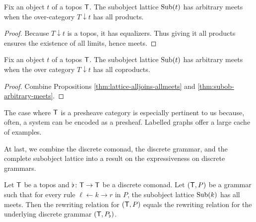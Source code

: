 \documentclass{amsart}
\begin{document}
\begin{proposition} \label{thm:subob-arbitrary-meets}
  Fix an object $t$ of a topos $ \mathsf{T} $.  The subobject
  lattice $ \operatorname{Sub} (t) $ has arbitrary meets when the over-category 
	$ T \downarrow t $ has all products.
\end{proposition}

\begin{proof}
  Because $ T \downarrow t $ is a topos, it has
  equalizers. Thus giving it all products ensures the
  existence of all limits, hence meets. 
\end{proof}

\begin{corollary}
  Fix an object $t$ of a topos $ \mathsf{T} $.  The subobject
  lattice $ \operatorname{Sub} (t) $ has arbitrary meets when the over
  category $ T \downarrow t $ has all coproducts.
\end{corollary}

\begin{proof}
  Combine Propositions \ref{thm:lattice-alljoins-allmeets}
  and \ref{thm:subob-arbitrary-meets}.
\end{proof}

The case where $\mathsf{T}$ is a presheave category is especially pertinent to us because, often, a system can be encoded as a presheaf. Labelled graphs offer a large cache of examples.

At last, we combine the discrete comonad, the discrete
grammar, and the complete subobject lattice into a result on
the expressiveness on discrete grammars.

\begin{theorem}
  \label{thm:production-same-rewrite-relation-as-discrete}  
  Let $ \mathsf{T} $ be a topos and $ \flat \colon \mathsf{T} \to \mathsf{T} $ be a
  discrete comonad.  Let $ ( \mathsf{T} , P ) $ be a grammar such
  that for every rule $ \ell \gets k \to r $ in $ P $, the
  subobject lattice $ \operatorname{Sub} (k) $ has all meets. Then the
  rewriting relation for $ ( \mathsf{T} , P ) $ equals the
  rewriting relation for the underlying discrete grammar
  $ ( \mathsf{T},P_\flat ) $.
\end{theorem}
\end{document}
